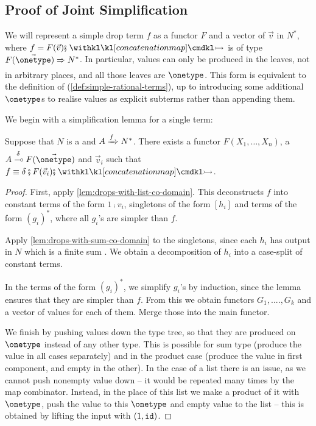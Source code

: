 \subsection{Proof of Joint Simplification}\label{sec:appendix:joint-drops-simplification}

We will represent a simple drop term $f$ as a functor $F$ and a vector of   $\vec v$ in $N^*$,
where $f = F(\vec v) \comp \concmap $ is of type $F(\vec \onetype) \drop{} N^*$. In particular, values can only be produced in the leaves, not in arbitrary places, and all those leaves are $\onetype$.
This form is equivalent to the definition of  (\cref{def:simple-rational-terms}), up to introducing some additional $\onetype$s to realise values as explicit subterms rather than appending them.


We begin with a simplification lemma for a single term:

\begin{lemma}\label{lem:drop-normalization}
    Suppose that $N$ is a  and $A \xRightarrow{f} N^*$. There exists a functor $F(X_1, \dots, X_n)$, a  $ A \lift{\delta} F(\vec \onetype)$ and  $\vec v_i$ such that $f \equiv \delta \comp F(\vec v_i) \comp \concmap$.
\end{lemma}
\begin{proof}
    First, apply \cref{lem:drops-with-list-co-domain}. This deconstructs $f$ into constant terms of the form $1\comp v_i$, singletons of the form $[h_i]$ and terms of the form $(g_i)^*$, where all $g_i$'s are simpler than $f$.

    Apply \cref{lem:drops-with-sum-co-domain} to the singletons, since each $h_i$ has output in $N$ which is a finite sum .
    We obtain a decomposition of $h_i$ into a case-split of constant terms.

    In the terms of the form $(g_i)^*$, we simplify $g_i$'s by induction, since the lemma ensures that they are simpler than $f$. 
    From this we obtain functors $G_1, ...., G_k$ and a vector of values for each of them. Merge those into the main functor.

    We finish by pushing values down the type tree, so that they are produced on $\onetype$ instead of any other type. 
    This is possible for sum type (produce the value in all cases separately) and in the product case (produce the value in first component, and empty in the other). In the case of a list there is an issue, as we cannot push nonempty value down -- it would be repeated many times by the map combinator. Instead, in the place of this list we make a product of it with $\onetype$, push the value to this $\onetype$ and empty value to the list -- this is obtained by lifting the input with $(1, \mathtt{id})$. 
\end{proof}

